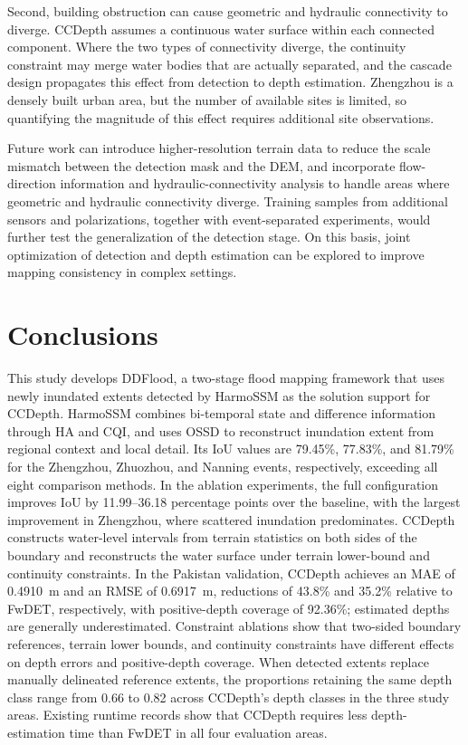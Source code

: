 \documentclass[authoryear,preprint,12pt]{elsarticle}
\begin{document}
Second, building obstruction can cause geometric and hydraulic connectivity to diverge. CCDepth assumes a continuous water surface within each connected component. Where the two types of connectivity diverge, the continuity constraint may merge water bodies that are actually separated, and the cascade design propagates this effect from detection to depth estimation. Zhengzhou is a densely built urban area, but the number of available sites is limited, so quantifying the magnitude of this effect requires additional site observations.

Future work can introduce higher-resolution terrain data to reduce the scale mismatch between the detection mask and the DEM, and incorporate flow-direction information and hydraulic-connectivity analysis to handle areas where geometric and hydraulic connectivity diverge. Training samples from additional sensors and polarizations, together with event-separated experiments, would further test the generalization of the detection stage. On this basis, joint optimization of detection and depth estimation can be explored to improve mapping consistency in complex settings.

\section{Conclusions}

This study develops DDFlood, a two-stage flood mapping framework that uses newly inundated extents detected by HarmoSSM as the solution support for CCDepth. HarmoSSM combines bi-temporal state and difference information through HA and CQI, and uses OSSD to reconstruct inundation extent from regional context and local detail. Its IoU values are 79.45\%, 77.83\%, and 81.79\% for the Zhengzhou, Zhuozhou, and Nanning events, respectively, exceeding all eight comparison methods. In the ablation experiments, the full configuration improves IoU by 11.99--36.18 percentage points over the baseline, with the largest improvement in Zhengzhou, where scattered inundation predominates. CCDepth constructs water-level intervals from terrain statistics on both sides of the boundary and reconstructs the water surface under terrain lower-bound and continuity constraints. In the Pakistan validation, CCDepth achieves an MAE of 0.4910~m and an RMSE of 0.6917~m, reductions of 43.8\% and 35.2\% relative to FwDET, respectively, with positive-depth coverage of 92.36\%; estimated depths are generally underestimated. Constraint ablations show that two-sided boundary references, terrain lower bounds, and continuity constraints have different effects on depth errors and positive-depth coverage. When detected extents replace manually delineated reference extents, the proportions retaining the same depth class range from 0.66 to 0.82 across CCDepth's depth classes in the three study areas. Existing runtime records show that CCDepth requires less depth-estimation time than FwDET in all four evaluation areas.
\end{document}
